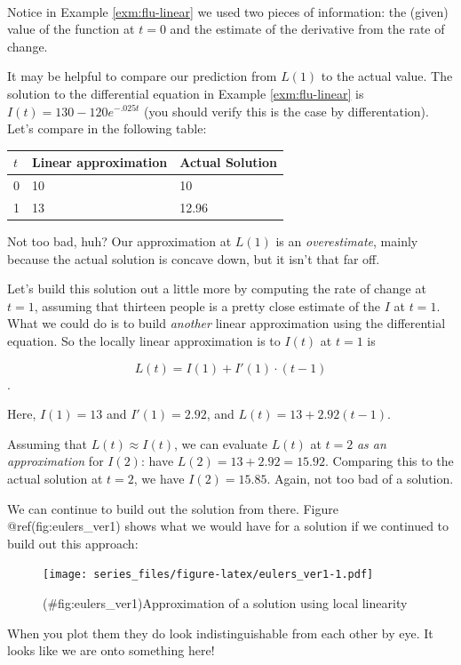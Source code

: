 \documentclass[
]{book}
\theoremstyle{definition}
\theoremstyle{definition}
\theoremstyle{definition}
\theoremstyle{remark}
\begin{document}
~

Notice in Example \ref{exm:flu-linear} we used two pieces of information: the (given) value of the function at \(t=0\) and the estimate of the derivative from the rate of change.

It may be helpful to compare our prediction from \(L(1)\) to the actual value. The solution to the differential equation in Example \ref{exm:flu-linear} is \(I(t) = 130-120e^{-.025t}\) (you should verify this is the case by differentation). Let's compare in the following table:

\begin{longtable}[]{@{}lll@{}}
\toprule
\(t\) & Linear approximation & Actual Solution \\
\midrule
\endhead
0 & 10 & 10 \\
1 & 13 & 12.96 \\
\bottomrule
\end{longtable}

Not too bad, huh? Our approximation at \(L(1)\) is an \emph{overestimate}, mainly because the actual solution is concave down, but it isn't that far off.

Let's build this solution out a little more by computing the rate of change at \(t=1\), assuming that thirteen people is a pretty close estimate of the \(I\) at \(t=1\). What we could do is to build \emph{another} linear approximation using the differential equation. So the locally linear approximation is to \(I(t)\) at \(t=1\) is

\[ L(t) = I(1) + I'(1) \cdot (t-1) \].

Here, \(I(1)=13\) and \(I'(1)=2.92\), and \(L(t) = 13 +2.92(t-1).\)

Assuming that \(L(t) \approx I(t)\), we can evaluate \(L(t)\) at \(t=2\) \emph{as an approximation} for \(I(2)\): have \(L(2)=13 + 2.92 = 15.92\). Comparing this to the actual solution at \(t=2\), we have \(I(2)=15.85\). Again, not too bad of a solution.

We can continue to build out the solution from there. Figure @ref(fig:eulers\_ver1) shows what we would have for a solution if we continued to build out this approach:

\begin{figure}
\centering
\texttt{[image: series\_files/figure-latex/eulers\_ver1-1.pdf]}
\caption{(\#fig:eulers\_ver1)Approximation of a solution using local linearity}
\end{figure}

When you plot them they do look indistinguishable from each other by eye. It looks like we are onto something here!
\end{document}
